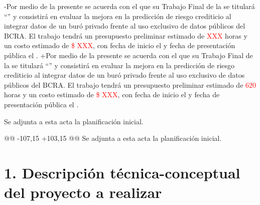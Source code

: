 \documentclass[
 11pt, %
-%
+codirector, %
 ]{charter}
\begin{document}
\begin{table}[ht]
-Por medio de la presente se acuerda con el \authorname\hspace{1px} que su Trabajo Final de la \degreename\hspace{1px} se titulará ``\ttitle'' y consistirá en {evaluar la mejora en la predicción de riesgo crediticio al integrar datos de un buró privado frente al uso exclusivo de datos públicos del BCRA}. El trabajo tendrá un presupuesto preliminar estimado de \textcolor{red}{XXX} horas y un costo estimado de \textcolor{red}{\$ XXX}, con fecha de inicio el \fechaInicioName\hspace{1px} y fecha de presentación pública el \fechaFinalName.
+Por medio de la presente se acuerda con el \authorname\hspace{1px} que su Trabajo Final de la \degreename\hspace{1px} se titulará ``\ttitle'' y consistirá en {evaluar la mejora en la predicción de riesgo crediticio al integrar datos de un buró privado frente al uso exclusivo de datos públicos del BCRA}. El trabajo tendrá un presupuesto preliminar estimado de \textcolor{red}{620} horas y un costo estimado de \textcolor{red}{\$ XXX}, con fecha de inicio el \fechaInicioName\hspace{1px} y fecha de presentación pública el \fechaFinalName.
 
 Se adjunta a esta acta la planificación inicial.
 
@@ -107,15 +103,15 @@ Se adjunta a esta acta la planificación inicial.
 \section{1. Descripción técnica-conceptual del proyecto a realizar}
 \label{sec:descripcion}
 

\end{table}
\end{document}
